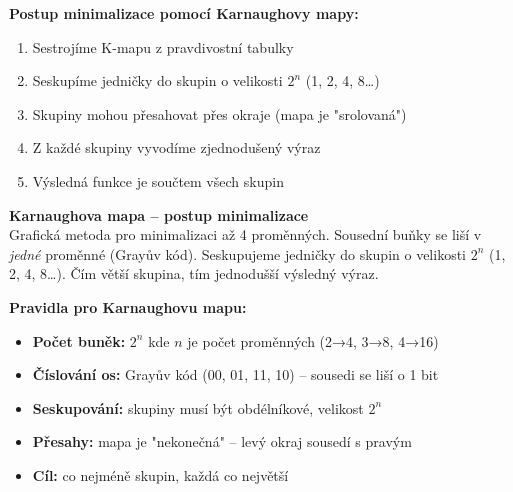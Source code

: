 \documentclass[a4paper,10pt]{article}
\begin{document}
\begin{vysvetlenibox}
\textbf{Postup minimalizace pomocí Karnaughovy mapy:}
\begin{enumerate}[noitemsep, leftmargin=1.4em, topsep=4pt]
    \item Sestrojíme K-mapu z pravdivostní tabulky
    \item Seskupíme jedničky do skupin o velikosti $2^n$ (1, 2, 4, 8\ldots)
    \item Skupiny mohou přesahovat přes okraje (mapa je "srolovaná")
    \item Z každé skupiny vyvodíme zjednodušený výraz
    \item Výsledná funkce je součtem všech skupin
\end{enumerate}

\textbf{Karnaughova mapa -- postup minimalizace}\\
Grafická metoda pro minimalizaci až 4 proměnných.
Sousední buňky se liší v \textit{jedné} proměnné (Grayův kód).
Seskupujeme jedničky do skupin o velikosti $2^n$ (1, 2, 4, 8\ldots).
Čím větší skupina, tím jednodušší výsledný výraz.

\textbf{Pravidla pro Karnaughovu mapu:}
\begin{itemize}[noitemsep, leftmargin=1.4em, topsep=4pt]
    \item \textbf{Počet buněk:} $2^n$ kde $n$ je počet proměnných (2→4, 3→8, 4→16)
    \item \textbf{Číslování os:} Grayův kód (00, 01, 11, 10) -- sousedi se liší o 1 bit
    \item \textbf{Seskupování:} skupiny musí být obdélníkové, velikost $2^n$
    \item \textbf{Přesahy:} mapa je "nekonečná" -- levý okraj sousedí s pravým
    \item \textbf{Cíl:} co nejméně skupin, každá co největší
\end{itemize}

\begin{center}
\end{center}


\end{vysvetlenibox}
\end{document}
